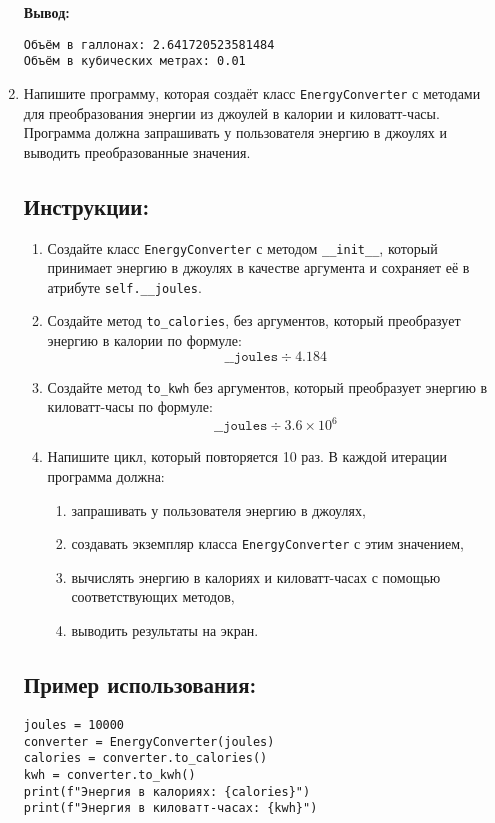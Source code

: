 \begin{enumerate}
\textbf{Вывод:}
\begin{verbatim}
Объём в галлонах: 2.641720523581484
Объём в кубических метрах: 0.01
\end{verbatim}

\item

Напишите программу, которая создаёт класс \texttt{EnergyConverter} с методами для преобразования энергии
из джоулей в калории и киловатт-часы. Программа должна запрашивать у пользователя энергию в джоулях
и выводить преобразованные значения.

\subsection*{Инструкции:}
\begin{enumerate}
\item Создайте класс \texttt{EnergyConverter} с методом
\texttt{\_\_init\_\_}, который принимает энергию в джоулях в
качестве аргумента и сохраняет её в атрибуте \texttt{self.\_\_joules}.

\item Создайте метод \texttt{to\_calories},
без аргументов, который преобразует энергию в калории по формуле:
\[
\texttt{\_\_joules} \div 4.184
\]

\item Создайте метод \texttt{to\_kwh} без аргументов,
который преобразует энергию в киловатт-часы по формуле:
\[
\texttt{\_\_joules} \div 3.6 \times 10^6
\]

\item Напишите цикл, который повторяется 10 раз. В каждой итерации программа должна:
\begin{enumerate}
\item запрашивать у пользователя энергию в джоулях,
\item создавать экземпляр класса \texttt{EnergyConverter} с этим значением,
\item вычислять энергию в калориях и киловатт-часах с помощью соответствующих методов,
\item выводить результаты на экран.
\end{enumerate}
\end{enumerate}

\subsection*{Пример использования:}
\begin{verbatim}
joules = 10000
converter = EnergyConverter(joules)
calories = converter.to_calories()
kwh = converter.to_kwh()
print(f"Энергия в калориях: {calories}")
print(f"Энергия в киловатт-часах: {kwh}")
\end{verbatim}


\end{enumerate}
